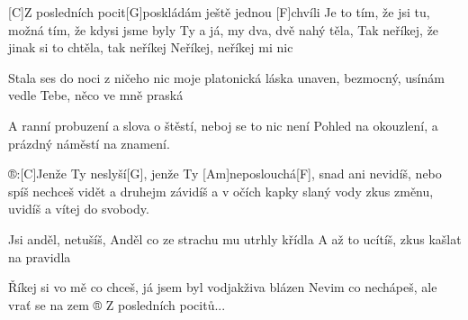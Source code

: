 
[C]Z posledních pocit[G]poskládám ještě jednou [F] chvíli
Je to tím, že jsi tu,
možná tím, že kdysi jsme byly Ty a
já, my dva, dvě nahý těla,
Tak neříkej, že jinak si to chtěla,
tak neříkej
Neříkej, neříkej mi nic

Stala ses do noci
z ničeho nic moje platonická láska
unaven, bezmocný,
usínám vedle Tebe, něco ve mně praská

A ranní probuzení
a slova o štěstí, neboj se to nic není
Pohled na okouzlení,
a prázdný náměstí na znamení.

®:[C]Jenže Ty neslyší[G], jenže Ty [Am]neposlouchá[F],
snad ani nevidíš, nebo spíš nechceš vidět
a druhejm závidíš a v očích kapky slaný vody
zkus změnu, uvidíš  a vítej do svobody.

Jsi anděl, netušíš,
Anděl co ze strachu mu utrhly křídla
A až to ucítíš, 
zkus kašlat na pravidla

Říkej si vo mě co chceš,
já jsem byl vodjakživa blázen
Nevim co nechápeš,
ale vrať se na zem 
®
Z posledních pocitů...